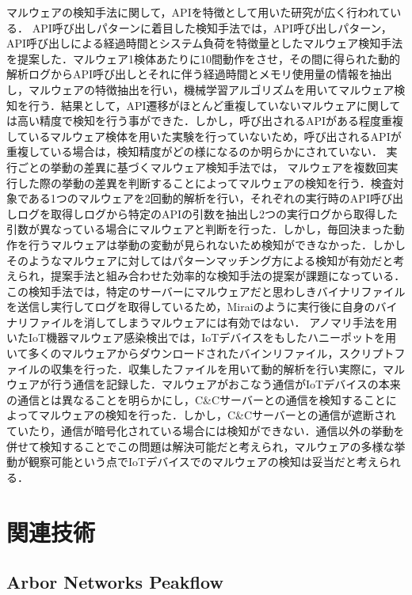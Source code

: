 マルウェアの検知手法に関して，APIを特徴として用いた研究が広く行われている．
API呼び出しパターンに着目した検知手法\cite{パターン}では，API呼び出しパターン，API呼び出しによる経過時間とシステム負荷を特徴量としたマルウェア検知手法を提案した．マルウェア1検体あたりに10間動作をさせ，その間に得られた動的解析ログからAPI呼び出しとそれに伴う経過時間とメモリ使用量の情報を抽出し，マルウェアの特徴抽出を行い，機械学習アルゴリズムを用いてマルウェア検知を行う．結果として，API遷移がほとんど重複していないマルウェアに関しては高い精度で検知を行う事ができた．しかし，呼び出されるAPIがある程度重複しているマルウェア検体を用いた実験を行っていないため，呼び出されるAPIが重複している場合は，検知精度がどの様になるのか明らかにされていない．
実行ごとの挙動の差異に基づくマルウェア検知手法\cite{挙動の差異}では，
マルウェアを複数回実行した際の挙動の差異を判断することによってマルウェアの検知を行う．検査対象である1つのマルウェアを2回動的解析を行い，それぞれの実行時のAPI呼び出しログを取得しログから特定のAPIの引数を抽出し2つの実行ログから取得した引数が異なっている場合にマルウェアと判断を行った．しかし，毎回決まった動作を行うマルウェアは挙動の変動が見られないため検知ができなかった．しかしそのようなマルウェアに対してはパターンマッチング方による検知が有効だと考えられ，提案手法と組み合わせた効率的な検知手法の提案が課題になっている．この検知手法では，特定のサーバーにマルウェアだと思わしきバイナリファイルを送信し実行してログを取得しているため，Miraiのように実行後に自身のバイナリファイルを消してしまうマルウェアには有効ではない．
アノマリ手法を用いたIoT機器マルウェア感染検出\cite{アノマリ手法}では，IoTデバイスをもしたハニーポットを用いて多くのマルウェアからダウンロードされたバインリファイル，スクリプトファイルの収集を行った．収集したファイルを用いて動的解析を行い実際に，マルウェアが行う通信を記録した．マルウェアがおこなう通信がIoTデバイスの本来の通信とは異なることを明らかにし，C\&Cサーバーとの通信を検知することによってマルウェアの検知を行った．しかし，C\&Cサーバーとの通信が遮断されていたり，通信が暗号化されている場合には検知ができない．通信以外の挙動を併せて検知することでこの問題は解決可能だと考えられ，マルウェアの多様な挙動が観察可能という点でIoTデバイスでのマルウェアの検知は妥当だと考えられる．

\section{関連技術}

\subsection{Arbor Networks Peakflow}

